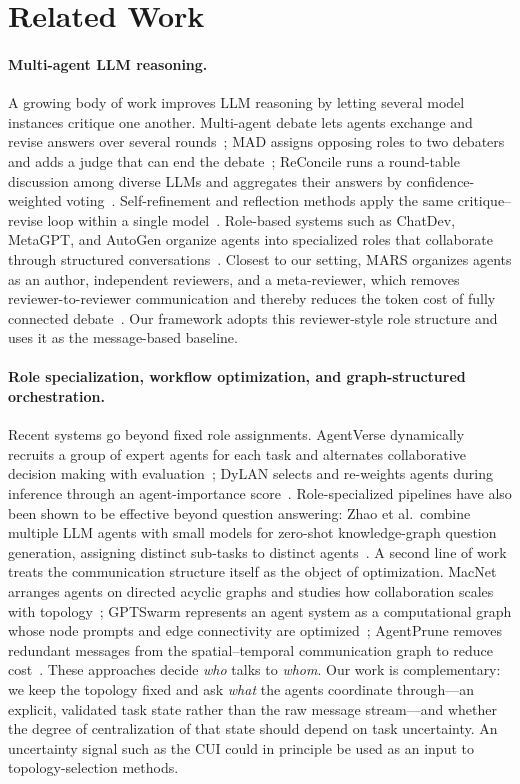 \section{Related Work}

\paragraph{Multi-agent LLM reasoning.}
A growing body of work improves LLM reasoning by letting several model instances critique one another.
Multi-agent debate lets agents exchange and revise answers over several rounds~\cite{du2024improving}; MAD assigns opposing roles to two debaters and adds a judge that can end the debate~\cite{liang2024mad}; ReConcile runs a round-table discussion among diverse LLMs and aggregates their answers by confidence-weighted voting~\cite{chen2024reconcile}.
Self-refinement and reflection methods apply the same critique--revise loop within a single model~\cite{madaan2023selfrefine,shinn2023reflexion}.
Role-based systems such as ChatDev, MetaGPT, and AutoGen organize agents into specialized roles that collaborate through structured conversations~\cite{qian2024chatdev,hong2024metagpt,wu2024autogen}.
Closest to our setting, MARS organizes agents as an author, independent reviewers, and a meta-reviewer, which removes reviewer-to-reviewer communication and thereby reduces the token cost of fully connected debate~\cite{wang2025mars}.
Our framework adopts this reviewer-style role structure and uses it as the message-based baseline.

\paragraph{Role specialization, workflow optimization, and graph-structured orchestration.}
Recent systems go beyond fixed role assignments.
AgentVerse dynamically recruits a group of expert agents for each task and alternates collaborative decision making with evaluation~\cite{chen2024agentverse}; DyLAN selects and re-weights agents during inference through an agent-importance score~\cite{liu2024dylan}.
Role-specialized pipelines have also been shown to be effective beyond question answering: Zhao et al.\ combine multiple LLM agents with small models for zero-shot knowledge-graph question generation, assigning distinct sub-tasks to distinct agents~\cite{zhao2024kgqg}.
A second line of work treats the communication structure itself as the object of optimization.
MacNet arranges agents on directed acyclic graphs and studies how collaboration scales with topology~\cite{qian2025scaling}; GPTSwarm represents an agent system as a computational graph whose node prompts and edge connectivity are optimized~\cite{zhuge2024gptswarm}; AgentPrune removes redundant messages from the spatial--temporal communication graph to reduce cost~\cite{zhang2025agentprune}.
These approaches decide \emph{who} talks to \emph{whom}.
Our work is complementary: we keep the topology fixed and ask \emph{what} the agents coordinate through---an explicit, validated task state rather than the raw message stream---and whether the degree of centralization of that state should depend on task uncertainty.
An uncertainty signal such as the CUI could in principle be used as an input to topology-selection methods.


